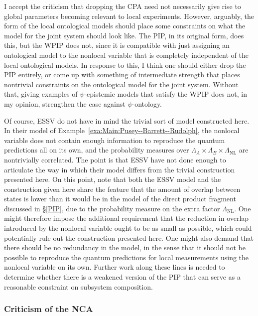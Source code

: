 \documentclass[DIV=calc,fontsize=12pt]{scrartcl} %
\theoremstyle{definition}
\theoremstyle{plain}
\begin{document}
I accept the criticism that dropping the CPA need not necessarily give
rise to global parameters becoming relevant to local experiments.
However, arguably, the form of the local ontological models should
place some constraints on what the model for the joint system should
look like.  The PIP, in its original form, does this, but the WPIP
does not, since it is compatible with just assigning an ontological
model to the nonlocal variable that is completely independent of the
local ontological models.  In response to this, I think one should
either drop the PIP entirely, or come up with something of
intermediate strength that places nontrivial constraints on the
ontological model for the joint system.  Without that, giving examples
of $\psi$-epistemic models that satisfy the WPIP does not, in my
opinion, strengthen the case against $\psi$-ontology.

Of course, ESSV do not have in mind the trivial sort of model
constructed here.  In their model of Example~\ref{exa:Main:Pusey--Barrett--Rudolph}, the
nonlocal variable does not contain enough information to reproduce the
quantum predictions all on its own, and the probability measures over
$\Lambda_A \times \Lambda_B \times \Lambda_{\text{NL}}$ are
nontrivially correlated.  The point is that ESSV have not done enough
to articulate the way in which their model differs from the trivial
construction presented here.  On this point, note that both the ESSV
model and the construction given here share the feature that the
amount of overlap between states is lower than it would be in the
model of the direct product fragment discussed in \S\ref{PIP}, due to
the probability measure on the extra factor $\Lambda_{\text{NL}}$.
One might therefore impose the additional requirement that the
reduction in overlap introduced by the nonlocal variable ought to be
as small as possible, which could potentially rule out the
construction presented here.  One might also demand that there should
be no redundancy in the model, in the sense that it should not be
possible to reproduce the quantum predictions for local measurements
using the nonlocal variable on its own.  Further work along these
lines is needed to determine whether there is a weakened version of
the PIP that can serve as a reasonable constraint on subsystem
composition.

\subsubsection{Criticism of the NCA}
\end{document}
